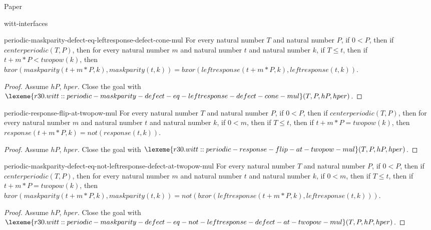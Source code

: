 \begin{lexlean}{Paper}
\begin{section}{witt-interfaces}
  \begin{theorem}{periodic-maskparity-defect-eq-leftresponse-defect-cone-mul}
  For every natural number \(T\) and natural number \(P\), if \(0 < P\), then if \(centerperiodic(T, P)\), then for every natural number \(m\) and natural number \(t\) and natural number \(k\), if \(T ≤ t\), then if \(t + m * P < twopow(k)\), then \(bxor(maskparity(t + m * P, k), maskparity(t, k)) = bxor(leftresponse(t + m * P, k), leftresponse(t, k))\).
  \begin{proof}
  Assume \(hP\), \(hper\).
  Close the goal with \(\lexeme{r30.witt::periodic-maskparity-defect-eq-leftresponse-defect-cone-mul}(T, P, hP, hper)\).
  \end{proof}
  \end{theorem}

  \begin{theorem}{periodic-response-flip-at-twopow-mul}
  For every natural number \(T\) and natural number \(P\), if \(0 < P\), then if \(centerperiodic(T, P)\), then for every natural number \(m\) and natural number \(t\) and natural number \(k\), if \(0 < m\), then if \(T ≤ t\), then if \(t + m * P = twopow(k)\), then \(response(t + m * P, k) = not(response(t, k))\).
  \begin{proof}
  Assume \(hP\), \(hper\).
  Close the goal with \(\lexeme{r30.witt::periodic-response-flip-at-twopow-mul}(T, P, hP, hper)\).
  \end{proof}
  \end{theorem}

  \begin{theorem}{periodic-maskparity-defect-eq-not-leftresponse-defect-at-twopow-mul}
  For every natural number \(T\) and natural number \(P\), if \(0 < P\), then if \(centerperiodic(T, P)\), then for every natural number \(m\) and natural number \(t\) and natural number \(k\), if \(0 < m\), then if \(T ≤ t\), then if \(t + m * P = twopow(k)\), then \(bxor(maskparity(t + m * P, k), maskparity(t, k)) = not(bxor(leftresponse(t + m * P, k), leftresponse(t, k)))\).
  \begin{proof}
  Assume \(hP\), \(hper\).
  Close the goal with \(\lexeme{r30.witt::periodic-maskparity-defect-eq-not-leftresponse-defect-at-twopow-mul}(T, P, hP, hper)\).
  \end{proof}
  \end{theorem}


\end{section}
\end{lexlean}
